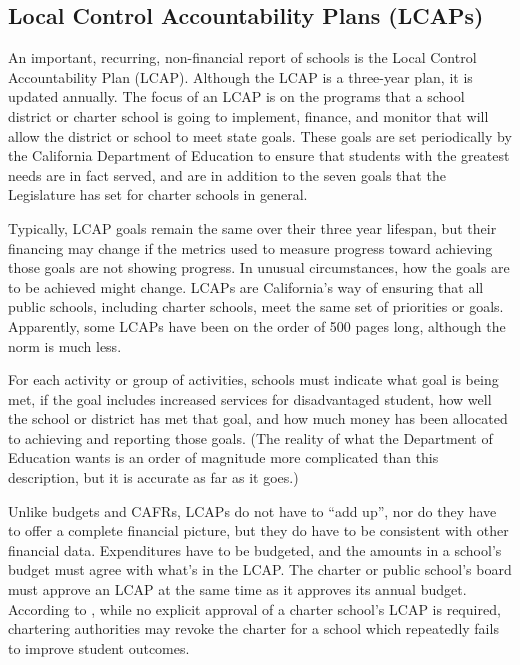 \subsection{Local Control Accountability Plans (LCAPs)}\label{sec:lcaps}\indent%

An important, recurring, non-financial report of schools is the Local Control Accountability Plan (LCAP).
 Although the LCAP is a three-year plan, it is updated annually. The focus of an LCAP is on the programs that a school district or charter school is going to implement, finance, and monitor that will allow the district or school to meet state goals. These goals are set periodically by the California Department of Education to ensure that students with the greatest needs are in fact served, and are in addition to the seven goals that the Legislature has set for charter schools in general.

Typically, LCAP goals remain the same over their three year lifespan, but their financing may change if the metrics used to measure progress toward achieving those goals are not showing progress. In unusual circumstances, how the goals are to be achieved might change. LCAPs are California's way of ensuring that all public schools, including charter schools, meet the same set of priorities or goals. Apparently, some LCAPs have been on the order of 500 pages long, although the norm is much less.

For each activity or group of activities, schools must indicate what goal is being met, if the goal includes increased services for disadvantaged student, how well the school or district has met that goal, and how much money has been allocated to achieving and reporting those goals. (The reality of what the Department of Education wants is an order of magnitude more complicated than this description, but it is accurate as far as it goes.)

Unlike budgets and CAFRs, LCAPs do not have to ``add up'', nor do they have to offer a complete financial picture, but they do have to be consistent with other financial data. Expenditures have to be budgeted, and the amounts in a school's budget must agree with what's in the LCAP\@. The charter or public school's board must approve an LCAP at the same time as it approves its annual budget. According to \textcite[81]{Aguinaldo.etal2022}, while no explicit approval of a charter school's LCAP is required, chartering authorities may revoke the charter for a school which repeatedly fails to improve student outcomes.

